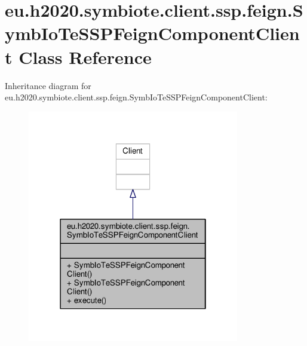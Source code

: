 \hypertarget{classeu_1_1h2020_1_1symbiote_1_1client_1_1ssp_1_1feign_1_1SymbIoTeSSPFeignComponentClient}{}\section{eu.\+h2020.\+symbiote.\+client.\+ssp.\+feign.\+Symb\+Io\+Te\+S\+S\+P\+Feign\+Component\+Client Class Reference}
\label{classeu_1_1h2020_1_1symbiote_1_1client_1_1ssp_1_1feign_1_1SymbIoTeSSPFeignComponentClient}


Inheritance diagram for eu.\+h2020.\+symbiote.\+client.\+ssp.\+feign.\+Symb\+Io\+Te\+S\+S\+P\+Feign\+Component\+Client\+:
\nopagebreak
\begin{figure}[H]
\begin{center}
\leavevmode
\includegraphics[width=262pt]{classeu_1_1h2020_1_1symbiote_1_1client_1_1ssp_1_1feign_1_1SymbIoTeSSPFeignComponentClient__inherit__graph}
\end{center}
\end{figure}


